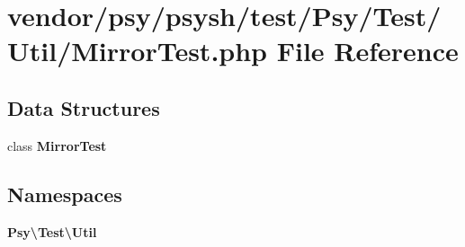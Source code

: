 \section{vendor/psy/psysh/test/\+Psy/\+Test/\+Util/\+Mirror\+Test.php File Reference}
\label{_mirror_test_8php}
\subsection*{Data Structures}
\begin{DoxyCompactItemize}
\item 
class {\bf Mirror\+Test}
\end{DoxyCompactItemize}
\subsection*{Namespaces}
\begin{DoxyCompactItemize}
\item 
 {\bf Psy\textbackslash{}\+Test\textbackslash{}\+Util}
\end{DoxyCompactItemize}
